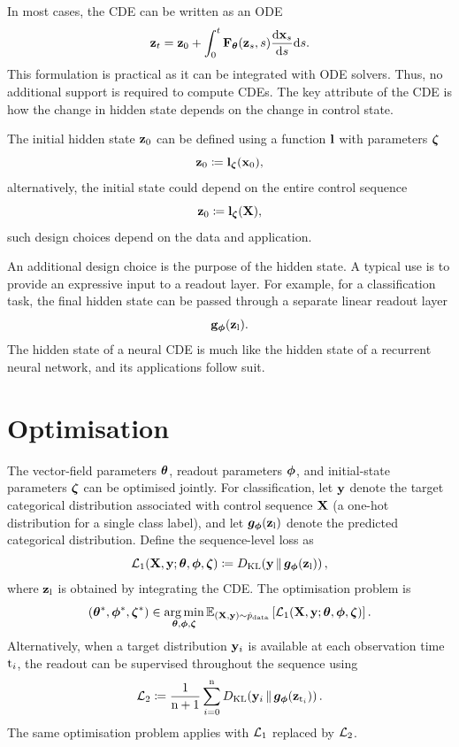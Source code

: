
In most cases, the \ac{CDE} can be written as an \ac{ODE}
\[
{\mathbf{z}}_t = {\mathbf{z}}_0 + \int_0^t{\mathbf{F}}_{\bm{\theta}}({\mathbf{z}}_s,s)\frac{\mathrm{d}{\mathbf{x}}_s}{\mathrm{d} s}\mathrm{d} s.
\label{eq:cde-as-ode}
\]
This formulation is practical as it can be integrated with \ac{ODE} solvers. Thus, no additional support is required to compute \acp{CDE}. The key attribute of the \ac{CDE} is how the change in hidden state depends on the change in control state.

The initial hidden state ${\mathbf{z}}_0$ can be defined using a function ${\mathbf{l}}$ with parameters ${\bm{\zeta}}$
\[
{\mathbf{z}}_0\coloneqq{\mathbf{l}}_{\bm{\zeta}}({\mathbf{x}}_0),
\]
alternatively, the initial state could depend on the entire control sequence
\[
{\mathbf{z}}_0\coloneqq{\mathbf{l}}_{\bm{\zeta}}({\mathbf{X}}),
\]
such design choices depend on the data and application.

An additional design choice is the purpose of the hidden state. A typical use is to provide an expressive input to a readout layer. For example, for a classification task, the final hidden state can be passed through a separate linear readout layer
\[
{\mathbf{g}}_{\bm{\phi}}({\mathbf{z}}_{\textnormal{l}}).
\]
The hidden state of a neural \ac{CDE} is much like the hidden state of a recurrent neural network, and its applications follow suit.





\section{Optimisation}
The vector-field parameters ${\bm{\theta}}$, readout parameters ${\bm{\phi}}$, and initial-state parameters ${\bm{\zeta}}$ can be optimised jointly. For classification, let ${\mathbf{y}}$ denote the target categorical distribution associated with control sequence ${\mathbf{X}}$ (a one-hot distribution for a single class label), and let ${\bm{g}}_{\bm{\phi}}({\mathbf{z}}_{\textnormal{l}})$ denote the predicted categorical distribution. Define the sequence-level loss as
\[
\mathcal{L}_1({\mathbf{X}},{\mathbf{y}};{\bm{\theta}},{\bm{\phi}},{\bm{\zeta}})
\coloneqq D_\mathrm{KL}\!\left({\mathbf{y}}\,\middle\|\,{\bm{g}}_{\bm{\phi}}({\mathbf{z}}_{\textnormal{l}})\right),
\]
where ${\mathbf{z}}_{\textnormal{l}}$ is obtained by integrating the \ac{CDE}. The optimisation problem is
\[
({\bm{\theta}}^*,{\bm{\phi}}^*,{\bm{\zeta}}^*)
\in\operatorname*{arg\,min}_{{\bm{\theta}},{\bm{\phi}},{\bm{\zeta}}}
\mathbb E_{({\mathbf{X}},{\mathbf{y}})\sim\hat{p}_{\rm{data}}}
\left[\mathcal{L}_1({\mathbf{X}},{\mathbf{y}};{\bm{\theta}},{\bm{\phi}},{\bm{\zeta}})\right].
\]
Alternatively, when a target distribution ${\mathbf{y}}_i$ is available at each observation time ${\textnormal{t}}_i$, the readout can be supervised throughout the sequence using
\[
\mathcal{L}_2\coloneqq\frac{1}{{\textnormal{n}}+1}\sum_{i=0}^{\textnormal{n}}
D_\mathrm{KL}\!\left({\mathbf{y}}_i\,\middle\|\,{\bm{g}}_{\bm{\phi}}({\mathbf{z}}_{{\textnormal{t}}_i})\right).
\]
The same optimisation problem applies with $\mathcal{L}_1$ replaced by $\mathcal{L}_2$.

